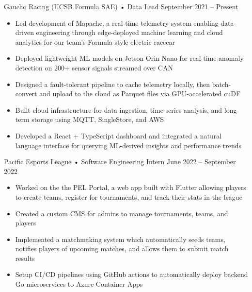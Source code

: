 \documentclass[9pt]{developercv} %
\begin{document}
\begin{entrylist}
{\begin{itemize}[noitemsep,topsep=0pt,parsep=0pt,partopsep=0pt, leftmargin=10pt]
        \end{itemize}}
    \entry
		{}
		{Gaucho Racing (UCSB Formula SAE) • Data Lead}
		{September 2021 – Present}
		{\vspace{-8pt}
        \begin{itemize}[noitemsep,topsep=0pt,parsep=0pt,partopsep=0pt, leftmargin=10pt]
            \item Led development of Mapache, a real-time telemetry system enabling data-driven engineering through edge-deployed machine learning and cloud analytics for our team's Formula-style electric racecar
            \item Deployed lightweight ML models on Jetson Orin Nano for real-time anomaly detection on 200+ sensor signals streamed over CAN
            \item Designed a fault-tolerant pipeline to cache telemetry locally, then batch-convert and upload to the cloud as Parquet files via GPU-accelerated cuDF
            \item Built cloud infrastructure for data ingestion, time-series analysis, and long-term storage using MQTT, SingleStore, and AWS
            \item Developed a React + TypeScript dashboard and integrated a natural language interface for querying ML-derived insights and performance trends
        \end{itemize}}
	\entry
		{}
		{Pacific Esports League • Software Engineering Intern}
		{June 2022 – September 2022}
		{\vspace{-8pt}
        \begin{itemize}[noitemsep,topsep=0pt,parsep=0pt,partopsep=0pt, leftmargin=10pt]
            \item Worked on the the PEL Portal, a web app built with Flutter allowing players to create teams, register for tournaments, and track their stats in the league
            \item Created a custom CMS for admins to manage tournaments, teams, and players
            \item Implemented a matchmaking system which automatically seeds teams, notifies players of upcoming matches, and allows them to submit match results
            \item Setup CI/CD pipelines using GitHub actions to automatically deploy backend Go microservices to Azure Container Apps
        \end{itemize}}
\end{entrylist}
\vspace{-10pt}
\end{document}
